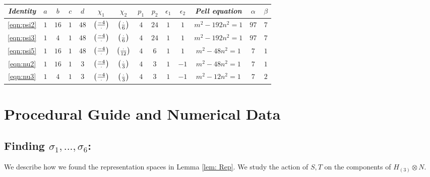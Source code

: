 \documentclass[11pt,reqno]{amsart}
\renewcommand{\=}{\;=\;}
\theoremstyle{myremark}
\begin{document}
\setlength{\tabcolsep}{7pt}   %
\begin{table}[H]
\caption{}
\label{table:Thm 4.2}
\centering    
\begin{tabular}{|c|c|c|c|c|c|c|c|c|c|c|c|c|c|}
\hline
\textit{Identity} & $a$ & $b$ & $c$ & $d$ & $\chi_1$ & $\chi_2$ & $p_1$ & $p_2$ & $\epsilon_1$ & $\epsilon_2$ & \textit{Pell equation} & $\alpha$ & $\beta$ \\[1pt]
\hline
\ref{eqn:psi2} & $1$ & $16$ & $1$ & $48$ & $\left(\frac{-4}{\vphantom{6}\cdot}\right)$ & $\left(\frac{\vphantom{-4}\cdot}{6}\right)$ & $4$ & $24$ & $1$ & $1$ & $m^2 - 192n^2 =1$ & $97$ & $7$ \\[1pt]
\hline
\ref{eqn:psi3} & $1$ & $4$ & $1$ & $48$ & $\left(\frac{-4}{\vphantom{6}\cdot}\right)$ & $\left(\frac{\vphantom{-4}\cdot}{6}\right)$ & $4$ & $24$ & $1$ & $1$ & $m^2 - 192n^2 =1$ & $97$ & $7$ \\
\hline
\ref{eqn:psi5} & $1$ & $16$ & $1$ & $48$ & $\left(\frac{-4}{\vphantom{6}\cdot}\right)$ & $\left(\frac{\vphantom{-4}\cdot}{12}\right)$ & $4$ & $6$ & $1$ & $1$ & $m^2 - 48n^2 =1$ & $7$ & $1$ \\
\hline
\ref{eqn:nu2} & $1$ & $16$ & $1$ & $3$ & $\left(\frac{-4}{\vphantom{6}\cdot}\right)$ & $\left(\frac{\vphantom{-4}\cdot}{3}\right)$ & $4$ & $3$ & $1$ & $-1$ & $m^2 - 48n^2 =1$ & $7$ & $1$ \\
\hline
\ref{eqn:nu3} & $1$ & $4$ & $1$ & $3$ & $\left(\frac{-4}{\vphantom{6}\cdot}\right)$ & $\left(\frac{\vphantom{-4}\cdot}{3}\right)$ & $4$ & $3$ & $1$ & $-1$ & $m^2 - 12n^2 =1$ & $7$ & $2$ \\
\hline
\end{tabular}
\end{table}
\newpage
\appendix
\renewcommand{\thesection}{\Roman{section}}
\section{\textbf{Procedural Guide and Numerical Data}}
\label{ProcGuide}
\renewcommand{\thesubsection}{\thesection.\alph{subsection}}
\subsection{Finding $\sigma_1,...,\sigma_6$:}\label{ap: rep}
We describe how we found the representation spaces in Lemma \ref{lem: Rep}.
We study the action of $S, T$ on the components of $H_{(3)} \otimes N$.
\end{document}
